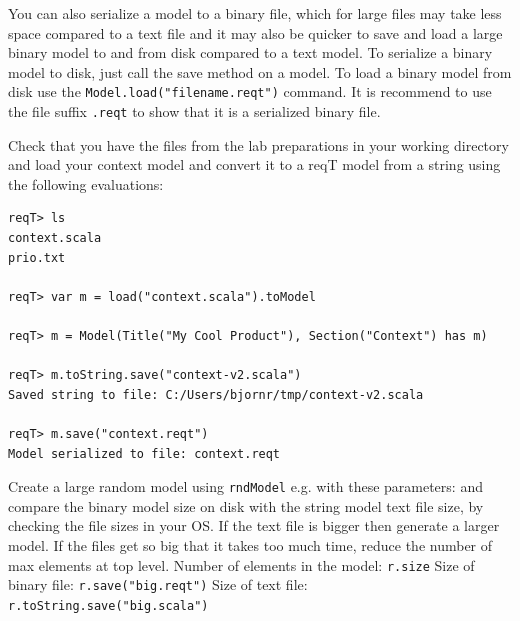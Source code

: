 \documentclass[11pt]{article}
\begin{document}
You can also serialize a model to a binary file, which for large files may take less space compared to a text file and it may also be quicker to save and load a large binary model to and from disk compared to a text model. To serialize a binary model to disk, just call the save method on a model. To load a binary model from disk use the \verb+Model.load("filename.reqt")+ command. It is recommend to use the file suffix \verb+.reqt+ to show that it is a serialized binary file.

\begin{framed}\noindent
Check that you have the files from the lab preparations in your working directory and load your context model and convert it to a reqT model from a string using the following evaluations: 
{\scriptsize \begin{verbatim}
reqT> ls
context.scala
prio.txt

reqT> var m = load("context.scala").toModel

reqT> m = Model(Title("My Cool Product"), Section("Context") has m)

reqT> m.toString.save("context-v2.scala")
Saved string to file: C:/Users/bjornr/tmp/context-v2.scala

reqT> m.save("context.reqt")
Model serialized to file: context.reqt
\end{verbatim}}
\noindent Create a large random model using \verb+rndModel+ e.g. with these parameters:  \newline and compare the binary model size on disk with the string model text file size, by checking the file sizes in your OS. If the text file is bigger then generate a larger model.  If the files get so big that it takes too much time, reduce the number of max elements at top level.\newline
\newline Number of elements in the model: {\footnotesize\verb+r.size+} \underline{\hspace{2cm}} 
\newline Size of binary file: {\footnotesize\verb+r.save("big.reqt")+}  \underline{\hspace{2cm}} 
\newline Size of text file: {\footnotesize\verb+r.toString.save("big.scala")+} \underline{\hspace{2cm}}
\end{framed}
\end{document}
